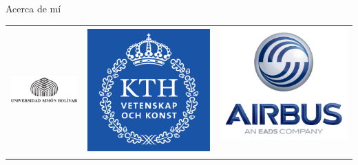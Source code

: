 \begin{frame}{Acerca de mí}
\begin{itemize}
    \begin{center}
      \begin{tabular}{c c c}
        \includegraphics[scale=0.2]{img/usb} &
        \includegraphics[scale=0.2]{img/kth} &
        \includegraphics[scale=0.2]{img/airbus} \
      \end{tabular}
    \end{center}
  \end{itemize}
\end{frame}
